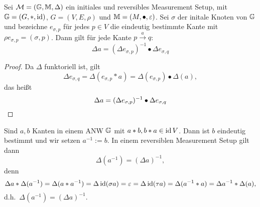 \newcommand*{\Init}[1][p]{\ensuremath{e_{\sigma, {#1}}}}
\begin{proposition}
    Sei $\mathcal{M} = (\mathbb{G}, \mathbb{M}, \Delta)$ ein initiales und reversibles Measurement Setup,
    mit $\mathbb{G} = (G, *, \operatorname{id})$, $G = (V, E, \rho)$ und $\mathbb{M} = (M, \bullet, \varepsilon)$.
    Sei $\sigma$ der initale Knoten von $\mathbb{G}$ und bezeichne $\Init$ für jedes $p\in V$ die eindeutig bestimmte Kante mit $\rho \Init = (\sigma, p)$.
    Dann gilt für jede Kante $p\xrightarrow{a} q$:
    \[
        \Delta a = (\Delta \Init[p])^{-1}\bullet \Delta \Init[q]
    \]
    \begin{proof}
        Da $\Delta$ funktoriell ist, gilt
        \[
            \Delta\Init[q]
                = \Delta(\Init[p]*a)
                = \Delta(\Init[p])\bullet\Delta(a),
        \]
        das heißt
        \[
            \Delta a = (\Delta\Init[p])^{-1} \bullet \Delta\Init[q]
                \qedhere
        \]
    \end{proof}
\end{proposition}
Sind $a, b$ Kanten in einem ANW $\mathbb{G}$ mit $a*b, b*a\in \operatorname{id} V$.
Dann ist $b$ eindeutig bestimmt und wir setzen $a^{-1} := b$.
In einem reversiblen Measurement Setup gilt dann
\[
    \Delta\left(a^{-1}\right) = (\Delta a)^{-1},
\]
denn
\[
    \Delta a*\Delta(a^{-1})
        = \Delta(a*a^{-1})
        = \Delta\operatorname{id}(\sigma a)
        = \varepsilon
        = \Delta\operatorname{id}(\tau a)
        = \Delta(a^{-1}*a)
        = \Delta a^{-1}*\Delta(a),
\]
d.h.~$\Delta(a^{-1}) = (\Delta a)^{-1}$.

